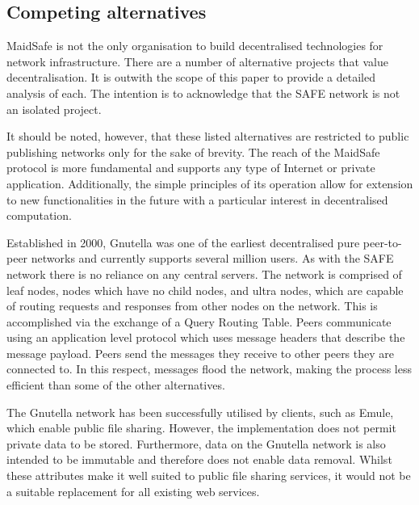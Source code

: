 \documentclass[twocolumn,english]{article}
\begin{document}
\subsection{Competing alternatives}


MaidSafe is not the only organisation to build decentralised technologies for network infrastructure.  There are a number of alternative projects that value decentralisation. It is outwith the scope of this paper to provide a detailed analysis of each.  The intention is to acknowledge that 
the SAFE network is not an isolated project.

It should be noted, however, that these listed alternatives are restricted to public publishing networks only for the sake of brevity.  The reach of the \mbox{MaidSafe} protocol is more fundamental and supports any type of Internet or private application. Additionally, the simple principles of its operation allow for extension to new functionalities in the future with a particular interest in decentralised computation.


Established in 2000, Gnutella was one of the earliest decentralised pure peer-to-peer networks and currently supports several million users.  As with the SAFE network there is no
reliance on any central servers. The network is comprised of leaf nodes, nodes which have no child nodes, and ultra nodes, which are capable of routing requests and responses
from other nodes on the network.  This is accomplished via the exchange of a Query Routing Table. Peers communicate using an application level protocol which uses message headers that describe the message payload.  Peers send the messages they receive to other peers they are connected to. In this respect, messages flood the network, making the process less efficient than some of the other alternatives.

The Gnutella network has been successfully utilised by clients, such as Emule, which enable public file sharing. However, the implementation does not permit private data to be stored. 
Furthermore, data on the Gnutella network is also intended to be immutable and therefore does not enable data removal. Whilst these attributes make it well suited to public file
sharing services, it would not be a suitable replacement for all existing web services.
\end{document}
